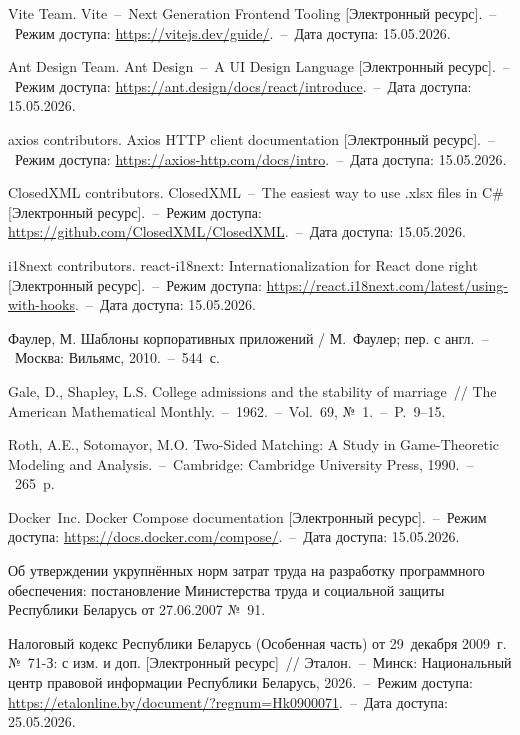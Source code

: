 \begin{enumerate}[label=\arabic*, wide=0pt, labelsep=1ex, nosep]
\src[vite] Vite Team. Vite~--~Next Generation Frontend Tooling [Электронный ресурс].~--~Режим доступа: \url{https://vitejs.dev/guide/}.~--~Дата доступа: 15.05.2026.

\src[antdesign] Ant Design Team. Ant Design~--~A UI Design Language [Электронный ресурс].~--~Режим доступа: \url{https://ant.design/docs/react/introduce}.~--~Дата доступа: 15.05.2026.

\src[axios] axios contributors. Axios HTTP client documentation [Электронный ресурс].~--~Режим доступа: \url{https://axios-http.com/docs/intro}.~--~Дата доступа: 15.05.2026.

\src[closedxml] ClosedXML contributors. ClosedXML~--~The easiest way to use .xlsx files in C\# [Электронный ресурс].~--~Режим доступа: \url{https://github.com/ClosedXML/ClosedXML}.~--~Дата доступа: 15.05.2026.

 i18next contributors. react-i18next: Internationalization for React done right [Электронный ресурс].~--~Режим доступа: \url{https://react.i18next.com/latest/using-with-hooks}.~--~Дата доступа: 15.05.2026.


 Фаулер, М. Шаблоны корпоративных приложений / М.~Фаулер; пер. с англ.~--~Москва: Вильямс, 2010.~--~544~с.

\src[gale] Gale, D., Shapley, L.S. College admissions and the stability of marriage~// The American Mathematical Monthly.~--~1962.~--~Vol.~69, №~1.~--~P.~9--15.

\src[roth] Roth, A.E., Sotomayor, M.O. Two-Sided Matching: A Study in Game-Theoretic Modeling and Analysis.~--~Cambridge: Cambridge University Press, 1990.~--~265~p.


\src[docker] Docker~Inc. Docker Compose documentation [Электронный ресурс].~--~Режим доступа: \url{https://docs.docker.com/compose/}.~--~Дата доступа: 15.05.2026.


\src[minlabor] Об утверждении укрупнённых норм затрат труда на разработку программного обеспечения: постановление Министерства труда и социальной защиты Республики Беларусь от 27.06.2007 №~91.

 Налоговый кодекс Республики Беларусь (Особенная часть) от 29~декабря 2009~г. №~71-З: с изм. и доп. [Электронный ресурс]~// Эталон.~--~Минск: Национальный центр правовой информации Республики Беларусь, 2026.~--~Режим доступа: \url{https://etalonline.by/document/?regnum=Hk0900071}.~--~Дата доступа: 25.05.2026.


\end{enumerate}
